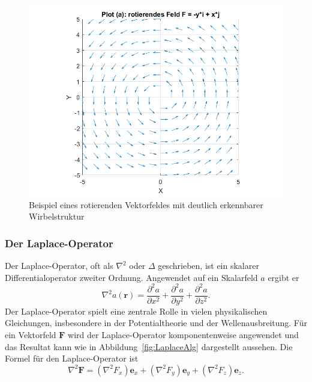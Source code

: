 \begin{figure}
    \centering
    \includegraphics[scale=0.4]{papers/helmholtz/images/rotierendes_Feld.png}
    \caption{Beispiel eines rotierenden Vektorfeldes mit deutlich erkennbarer Wirbelstruktur}
    \label{fig:RotationAlg}
\end{figure}

\subsubsection{Der Laplace-Operator}

Der Laplace-Operator, oft als $\nabla^2$ oder $\Delta$ geschrieben,
ist ein skalarer Differentialoperator zweiter Ordnung.
Angewendet auf ein Skalarfeld $a$ ergibt er
\begin{equation}
\nabla^2 a(\boldsymbol{r}) = \frac{\partial^2 a}{\partial x^2} + \frac{\partial^2 a}{\partial y^2} + \frac{\partial^2 a}{\partial z^2}.
\end{equation}
Der Laplace-Operator spielt eine zentrale Rolle in vielen physikalischen Gleichungen, insbesondere in der Potentialtheorie und der Wellenausbreitung.
Für ein Vektorfeld $\boldsymbol{F}$ wird der Laplace-Operator
komponentenweise angewendet und das Resultat kann wie in
Abbildung~\ref{fig:LaplaceAlg} dargestellt aussehen.
Die Formel für den Laplace-Operator ist
\begin{equation}
\nabla^2 \boldsymbol{F} = (\nabla^2 F_x)\boldsymbol{e}_x + (\nabla^2 F_y)\boldsymbol{e}_y + (\nabla^2 F_z)\boldsymbol{e}_z.
\end{equation}

